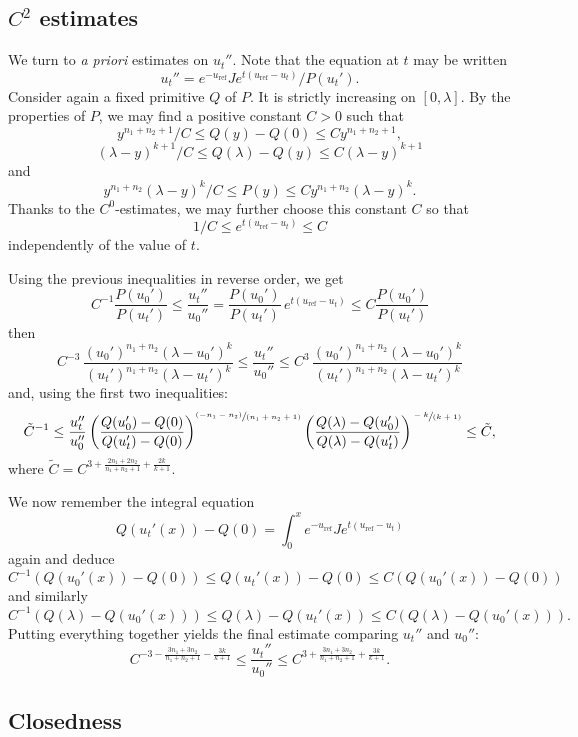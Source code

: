 \documentclass[10pt]{amsart}
\newcommand{\spfrac}[2]{\sfrac{#1}{(#2)}}
\newcommand{\pspfrac}[2]{\sfrac{(#1)}{(#2)}}
\theoremstyle{plain}
\theoremstyle{definition}
\begin{document}
\subsection{$C^2$ estimates}

We turn to \emph{a priori} estimates on $u_t''$.
Note that the equation at $t$ may be written
\[ u_t''=e^{-u_{\mathrm{ref}}}Je^{t(u_{\mathrm{ref}}-u_t)}/P(u_t'). \]
Consider again a fixed primitive $Q$ of $P$. It is strictly increasing
on $[0,\lambda]$. By the properties of $P$, we may find a positive constant
$C>0$ such that
\[ y^{n_1+n_2+1}/C \leq Q(y)-Q(0) \leq Cy^{n_1+n_2+1}, \]
\[ (\lambda-y)^{k+1}/C \leq Q(\lambda)-Q(y) \leq C(\lambda-y)^{k+1} \]
and
\[ y^{n_1+n_2}(\lambda-y)^k/C \leq P(y) \leq Cy^{n_1+n_2}(\lambda-y)^k. \]
Thanks to the $C^0$-estimates, we may further choose this constant $C$ so that
\[ 1/C \leq e^{t(u_{\mathrm{ref}}-u_t)} \leq C \]
independently of the value of $t$.

Using the previous inequalities in reverse order, we get
\[ C^{-1}\frac{P(u_0')}{P(u_t')}
	\leq \frac{u_t''}{u_0''}=\frac{P(u_0')}{P(u_t')}\,e^{t(u_{\mathrm{ref}}-u_t)}
	\leq C\frac{P(u_0')}{P(u_t')} \]
then
\[ C^{-3}\,\frac{(u_0')^{n_1+n_2}(\lambda-u_0')^k}{(u_t')^{n_1+n_2}(\lambda-u_t')^k}
	\leq \frac{u_t''}{u_0''} \leq
	C^3\,\frac{(u_0')^{n_1+n_2}(\lambda-u_0')^k}{(u_t')^{n_1+n_2}(\lambda-u_t')^k} \]
and, using the first two inequalities:
\[ \tilde{C}^{-1}
\leq \frac{u_t''}{u_0''} \left(\frac{Q(u_0')-Q(0)}{Q(u_t')-Q(0)}\right)^{\pspfrac{-n_1-n_2}{n_1+n_2+1}}
\left(\frac{Q(\lambda)-Q(u_0')}{Q(\lambda)-Q(u_t')}\right)^{\spfrac{-k}{k+1}} \leq
\tilde{C}, \]
where $\tilde{C}=C^{3+\frac{2n_1+2n_2}{n_1+n_2+1}+\frac{2k}{k+1}}$.

We now remember the integral equation
$$Q(u_t'(x))-Q(0) = \int_0^xe^{-u_{\mathrm{ref}}}Je^{t(u_{\mathrm{ref}}-u_t)}$$
again and deduce
\[ C^{-1}(Q(u_0'(x))-Q(0)) 	\leq Q(u_t'(x))-Q(0) \leq C(Q(u_0'(x))-Q(0)) \]
and similarly
\[ C^{-1}(Q(\lambda)-Q(u_0'(x))) 	\leq Q(\lambda)-Q(u_t'(x)) \leq C(Q(\lambda)-Q(u_0'(x))). \]
Putting everything together yields the final estimate comparing $u_t''$ and $u_0''$:
\[ C^{-3-\frac{3n_1+3n_2}{n_1+n_2+1}-\frac{3k}{k+1}}
	\leq \frac{u_t''}{u_0''}
	\leq C^{3+\frac{3n_1+3n_2}{n_1+n_2+1}+\frac{3k}{k+1}}. \]
	
\subsection{Closedness}
\end{document}
